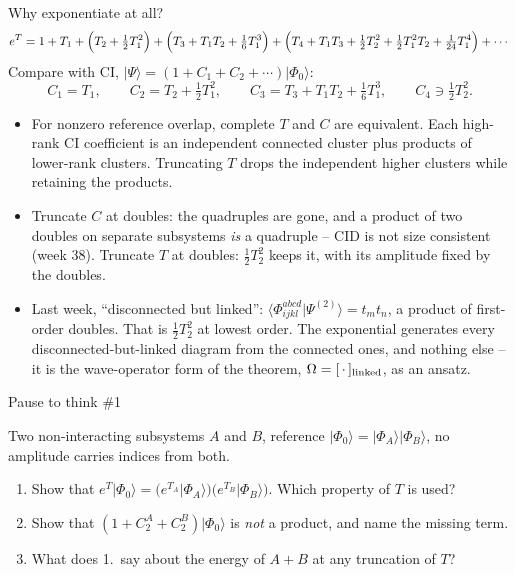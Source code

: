 \documentclass[aspectratio=169,10pt]{beamer}
\newcounter{thinkctr}
\newcommand{\thinkq}[2]{%
  \stepcounter{thinkctr}%
  \vfill
  \begin{tcolorbox}[enhanced,colback=palewarm,colframe=warm,boxrule=1.2pt,arc=4pt,
    grow to left by=6mm,grow to right by=6mm,
    left=16pt,right=16pt,top=16pt,bottom=18pt,
    fonttitle=\bfseries\Large,fontupper=\Large,
    title={Pause to think \#\thethinkctr\hfill\mdseries\normalsize(about #1 min -- discuss with your neighbour)}]
  #2
  \end{tcolorbox}
  \vfill}
\newcommand{\ket}[1]{\vert #1\rangle}
\newcommand{\ph}{\Phi_0}
\begin{document}
\begin{frame}[shrink=6]{Why exponentiate at all?}
\small
\[
e^{T}=1+T_1+\Bigl(T_2+\tfrac12T_1^2\Bigr)+\Bigl(T_3+T_1T_2+\tfrac16T_1^3\Bigr)+\Bigl(T_4+T_1T_3+\tfrac12T_2^2+\tfrac12T_1^2T_2+\tfrac1{24}T_1^4\Bigr)+\cdots
\]
Compare with CI, $\ket{\Psi}=(1+C_1+C_2+\cdots)\ket{\ph}$:
\[
C_1=T_1,\qquad C_2=T_2+\tfrac12T_1^2,\qquad C_3=T_3+T_1T_2+\tfrac16T_1^3,\qquad C_4\ni\tfrac12T_2^2 .
\]
\begin{itemize}
\item For nonzero reference overlap, complete $T$ and $C$ are equivalent. Each high-rank CI coefficient is an independent connected cluster plus products of lower-rank clusters. Truncating $T$ drops the independent higher clusters while retaining the products.
\item Truncate $C$ at doubles: the quadruples are gone, and a product of two doubles on separate subsystems \emph{is} a quadruple -- CID is not size consistent (week 38). Truncate $T$ at doubles: $\tfrac12T_2^2$ keeps it, with its amplitude fixed by the doubles.
\item Last week, ``disconnected but linked'': $\langle\Phi_{ijkl}^{abcd}|\Psi^{(2)}\rangle=t_mt_n$, a product of first-order doubles. That is $\tfrac12T_2^2$ at lowest order. The exponential generates every disconnected-but-linked diagram from the connected ones, and nothing else -- it is the wave-operator form of the theorem, $\Omega=[\,\cdot\,]_{\rm linked}$, as an ansatz.
\end{itemize}
\end{frame}

\begin{frame}{Pause to think \#1}
\thinkq{3}{Two non-interacting subsystems $A$ and $B$, reference $\ket{\ph}=\ket{\Phi_A}\ket{\Phi_B}$, no amplitude carries indices from both.
\begin{enumerate}
\item Show that $e^{T}\ket{\ph}=\bigl(e^{T_A}\ket{\Phi_A}\bigr)\bigl(e^{T_B}\ket{\Phi_B}\bigr)$. Which property of $T$ is used?
\item Show that $(1+C_2^A+C_2^B)\ket{\ph}$ is \emph{not} a product, and name the missing term.
\item What does 1.\ say about the energy of $A+B$ at any truncation of $T$?
\end{enumerate}}
\end{frame}
\end{document}
